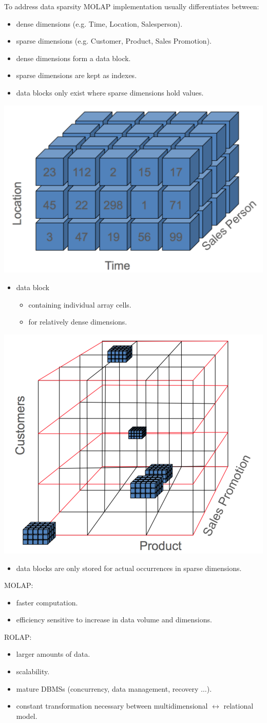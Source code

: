 \begin{breakbox}
\newline To address data sparsity MOLAP implementation usually differentiates between:
\begin{itemize}
	\item dense dimensions (e.g. Time, Location, Salesperson).
	\item sparse dimensions (e.g. Customer, Product, Sales Promotion).
	\item dense dimensions form a data block.
	\item sparse dimensions are kept as indexes.
	\item data blocks only exist where sparse dimensions hold values.
\end{itemize}
\begin{center}
\includegraphics[width=.05\textwidth]{slides_images/dense_molap}
\end{center}
\begin{itemize}
	\item data block
	\begin{itemize}
		\item containing individual array cells.
		\item for relatively dense dimensions.
	\end{itemize}
\end{itemize}
\begin{center}
\includegraphics[width=.05\textwidth]{slides_images/sparse_molap}
\end{center}
\begin{itemize}
	\item data blocks are only stored for actual occurrences in sparse dimensions.
\end{itemize}
\end{breakbox}

\begin{breakbox}
\newline MOLAP:
\begin{itemize}
	\item faster computation.
	\item efficiency sensitive to increase in data volume and dimensions.
\end{itemize}
ROLAP:
\begin{itemize}
	\item larger amounts of data.
	\item scalability.
	\item mature DBMSs (concurrency, data management, recovery $\ldots$).
	\item constant transformation necessary between multidimensional $\leftrightarrow$ relational model.
\end{itemize}
\end{breakbox}

